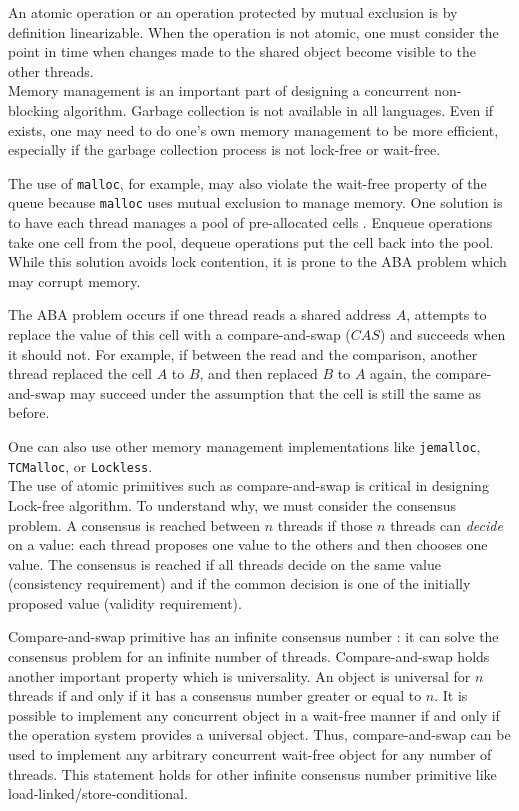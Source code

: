 An atomic operation or an operation protected by mutual exclusion is by
definition linearizable. When the operation is not atomic, one must consider the
point in time when changes made to the shared object become visible to the other
threads. \\

 Memory management is an important part of designing a
concurrent non-blocking algorithm. Garbage collection is not available in all
languages. Even if exists, one may need to do one's own memory management to
be more efficient, especially if the garbage collection process is not lock-free
or wait-free.

The use of \texttt{malloc}, for example, may also violate the wait-free property
of the queue because \texttt{malloc} uses mutual exclusion to manage memory. One
solution is to have each thread manages a pool of pre-allocated cells
\cite{Herlihy08}. Enqueue operations take one cell from the pool, dequeue
operations put the cell back into the pool. While this solution avoids lock
contention, it is prone to the ABA problem which may corrupt memory.

The ABA problem occurs if one thread reads a shared address $A$, attempts to
replace the value of this cell with a compare-and-swap ($CAS$) and succeeds when
it should not. For example, if between the read and the comparison, another
thread replaced the cell $A$ to $B$, and then replaced $B$ to $A$ again, the
compare-and-swap may succeed under the assumption that the cell is still the
same as before.

One can also use other memory management implementations like \texttt{jemalloc},
\texttt{TCMalloc}, or \texttt{Lockless}. \\

 The use of atomic primitives such as compare-and-swap is
critical in designing Lock-free algorithm. To understand why, we must consider
the consensus problem. A consensus is reached between $n$ threads if those $n$
threads can \textit{decide} on a value: each thread proposes one value to the
others and then chooses one value. The consensus is reached if all threads
decide on the same value (consistency requirement) and if the common decision is
one of the initially proposed value (validity requirement).

Compare-and-swap primitive has an infinite consensus number
\cite{Herlihy:1991:WS:114005.102808}: it can solve the consensus problem for an
infinite number of threads. Compare-and-swap holds another important property
which is universality. An object is universal for $n$ threads if and only if it
has a consensus number greater or equal to $n$. It is possible to implement any
concurrent object in a wait-free manner if and only if the operation system
provides a universal object. Thus, compare-and-swap can be used to implement
any arbitrary concurrent wait-free object for any number of threads. This
statement holds for other infinite consensus number primitive like
load-linked/store-conditional. \\

